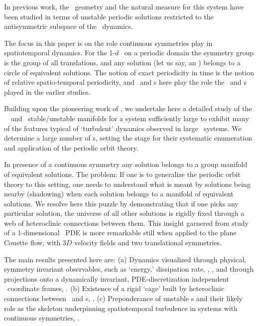 In previous work,
the \statesp\ geometry and the natural measure for
this system have been studied
in terms of unstable periodic solutions
restricted to
the antisymmetric subspace of the \KS\ dynamics.

The focus in this paper is on the role continuous symmetries
play in spatiotemporal dynamics. For the 1-$d$ \KS\ on a periodic domain
the symmetry group is the group of all translations, and
any solution (let us say, an \eqv ) belongs to a circle of equivalent
solutions. The notion of exact periodicity in time is
 the notion of relative spatio-temporal periodicity, and
\reqva\ and \rpo s here play the role the \eqva\ and
\po s played in the earlier studies.

Building upon the pioneering work of
, we undertake here a detailed study of the
\KS\ \eqva\ and \reqva\ stable/unstable manifolds
for a system sufficiently large to exhibit many of
the features typical of `turbulent' dynamics observed in large \KS\ systems.
We determine a large number of \rpo s, setting the
stage for their systematic enumeration and application
of the periodic orbit theory.

In presence of a continuous symmetry any solution belongs to a
group manifold of equivalent solutions. The problem: If one is to generalize
the periodic orbit theory to this setting, one needs to understand what
is meant by solutions being nearby (shadowing) when each solution
belongs to
a manifold of equivalent solutions.
We resolve here this puzzle by demonstrating that if one picks
any particular solution, the universe of all other solutions is
rigidly fixed through a web of heteroclinic connections between them.
This insight garnered from study of a
1-dimensional \KS\ PDE is more remarkable still when applied to
the plane Couette flow, with $3D$ velocity fields
and two translational symmetries.


The main results presented here are:
(a)
Dynamics visualized
through physical, symmetry invariant observables, such as
`energy,' dissipation rate, \etc,
, and through projections onto
a dynamically invariant, PDE-discretization
independent \statesp\ coordinate frames, .
(b)
Existence of a rigid `cage' built by heteroclinic connections
between \eqva\ and \po s,
.
(c)
Preponderance of unstable \rpo s and their likely
role as the skeleton underpinning spatiotemporal turbulence in
systems with continuous symmetries,
.
